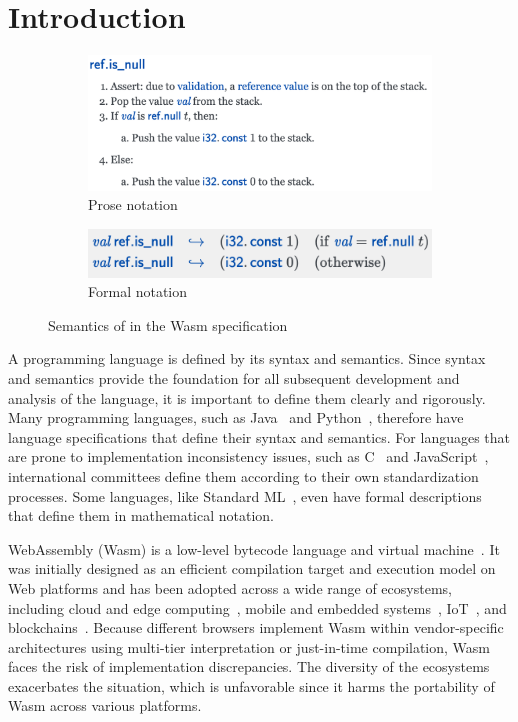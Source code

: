\section{Introduction}\label{sec:intro}
\begin{figure}[t]
\centering
  \begin{subfigure}[b]{\textwidth}
  \centering
  \includegraphics[width=.65\textwidth]{../img/prosespec1}
  \caption{Prose notation}
  \label{fig:prosespec1}
  \end{subfigure}
\vspace*{0em}

  \begin{subfigure}[b]{\textwidth}
  \centering
    \includegraphics[width=.5\textwidth]{../img/formalspec1}
    \caption{Formal notation}
    \label{fig:formalspec1}
  \end{subfigure}
  \caption{Semantics of  in the Wasm specification}
  \label{fig:spec1}
\end{figure}

A programming language is defined by its syntax and semantics.
Since syntax and semantics provide the foundation for all subsequent development and
analysis of the language, it is important to define them clearly and rigorously. 
Many programming languages, such as Java~\cite{javaspec} and Python~\cite{pythonspec},
therefore have language specifications that define their syntax and semantics.
For languages that are prone to implementation inconsistency issues,
such as C~\cite{cstandard} and JavaScript~\cite{ecmascript},
international committees define them according to their own standardization processes.
Some languages, like Standard ML~\cite{sml}, even have formal descriptions
that define them in mathematical notation.

WebAssembly (Wasm) is a low-level bytecode language and virtual machine~\cite{wasmspec}.
It was initially designed as an efficient compilation target and execution model on Web platforms
and has been adopted across a wide range of ecosystems,
including cloud and edge computing~\cite{lucet, cloudflare}, 
mobile and embedded systems~\cite{wasm-embedded}, IoT~\cite{wasm-iot}, and
blockchains~\cite{wasm-blockchain}.
Because different browsers implement Wasm within vendor-specific architectures
using multi-tier interpretation or just-in-time compilation,
Wasm faces the risk of implementation discrepancies.
The diversity of the ecosystems exacerbates the situation,
which is unfavorable since it harms the portability of Wasm across various platforms.

